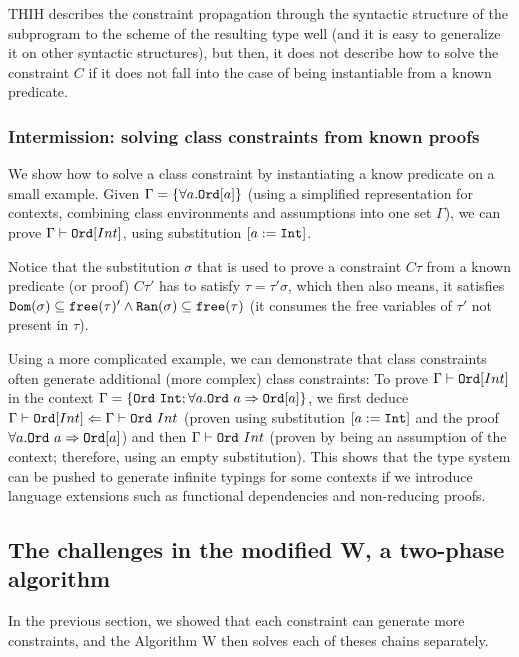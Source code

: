 THIH describes the constraint propagation through the syntactic structure of the subprogram to the scheme of the resulting type well (and it is easy to generalize it on other syntactic structures), but then, it does not describe how to solve the constraint $C$ if it does not fall into the case of being instantiable from a known predicate.

\subsubsection{Intermission: solving class constraints from known proofs}

We show how to solve a class constraint by instantiating a know predicate on a small example. Given $\Gamma = \{\forall a . \mathtt{Ord} [a]\}$ (using a simplified representation for contexts, combining class environments and assumptions into one set $\Gamma$), we can prove $\Gamma \vdash \mathtt{Ord} [Int]$, using substitution $[a := \mathtt{Int}]$.

Notice that the substitution $\sigma$ that is used to prove a constraint $C \tau$ from a known predicate (or proof) $C \tau'$ has to satisfy $\tau = \tau' \sigma$, which then also means, it satisfies $\mathtt{Dom} (\sigma) \subseteq \mathtt{free} (\tau)' \land \mathtt{Ran} (\sigma) \subseteq \mathtt{free} (\tau)$ (it consumes the free variables of $\tau'$ not present in $\tau$).

Using a more complicated example, we can demonstrate that class constraints often generate additional (more complex) class constraints: To prove $\Gamma \vdash \mathtt{Ord} [Int]$ in the context $\Gamma = \{\mathtt{Ord}\ \mathtt{Int}; \forall a . \mathtt{Ord}\ a \Rightarrow \mathtt{Ord} [a]\}$, we first deduce $\Gamma \vdash \mathtt{Ord} [Int] \Leftarrow \Gamma \vdash \mathtt{Ord}\ Int$ (proven using substitution $[a := \mathtt{Int}]$ and the proof $\forall a . \mathtt{Ord}\ a \Rightarrow \mathtt{Ord} [a]$) and then $\Gamma \vdash \mathtt{Ord}\ Int$ (proven by being an assumption of the context; therefore, using an empty substitution). This shows that the type system can be pushed to generate infinite typings for some contexts if we introduce language extensions such as functional dependencies and non-reducing proofs.

\subsection{The challenges in the modified W,  a two-phase algorithm}

In the previous section, we showed that each constraint can generate more constraints, and the Algorithm W then solves each of theses chains separately. 

